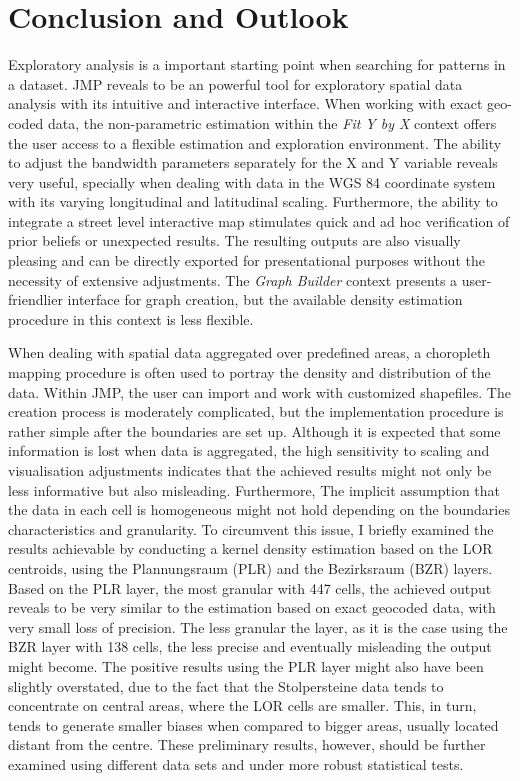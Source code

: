 \chapter{Conclusion and Outlook}

Exploratory analysis is a important starting point when searching for patterns in a dataset.  JMP reveals to be an powerful tool for exploratory spatial data analysis with its intuitive
and interactive interface. When working with exact geo-coded data, the non-parametric estimation within the \textit{Fit Y by X} context offers the user access to a flexible estimation and exploration environment. The ability to adjust the bandwidth parameters separately for the X and Y variable reveals very useful, specially when dealing with data in the WGS 84 coordinate system with its varying longitudinal and latitudinal scaling.  Furthermore, the ability to integrate a street level interactive map stimulates quick and ad hoc verification of prior beliefs or unexpected results.  The resulting outputs are also visually pleasing and can be directly exported for presentational purposes without the necessity of extensive adjustments. The \textit{Graph Builder} context presents a user-friendlier interface for graph creation, but the available density estimation procedure in this context is less flexible. 

When dealing with spatial data aggregated over predefined areas, a choropleth mapping procedure is often used to portray the density and distribution of the data. Within JMP, the user can import and work with customized shapefiles. The creation process is moderately complicated, but the implementation procedure is rather simple after the boundaries are set up.  Although it is expected that some information is lost when data is aggregated, the high sensitivity to scaling and visualisation adjustments indicates that the achieved results might not only be less informative but also misleading.  Furthermore, The implicit assumption that the data in each cell is homogeneous might not hold depending on the boundaries characteristics and granularity.  To circumvent this issue, I briefly examined the results achievable by conducting a kernel density estimation based on the LOR centroids, using the Plannungsraum (PLR) and the Bezirksraum (BZR) layers.  Based on the PLR layer, the most granular with 447 cells, the achieved output reveals to be very similar to the estimation based on exact geocoded data, with very small loss of precision.  The less granular the layer, as it is the case using the BZR layer with 138 cells, the less precise and eventually misleading the output might become.   The positive results using the PLR layer might also have been slightly overstated, due to the fact that the Stolpersteine data tends to concentrate on central areas, where the LOR cells are smaller. This, in turn, tends to generate smaller biases when compared to bigger areas, usually located distant from the centre.  These preliminary results, however, should be further examined using different data sets and under more robust statistical tests.  







\vspace{4cm}



\vspace{1cm}

